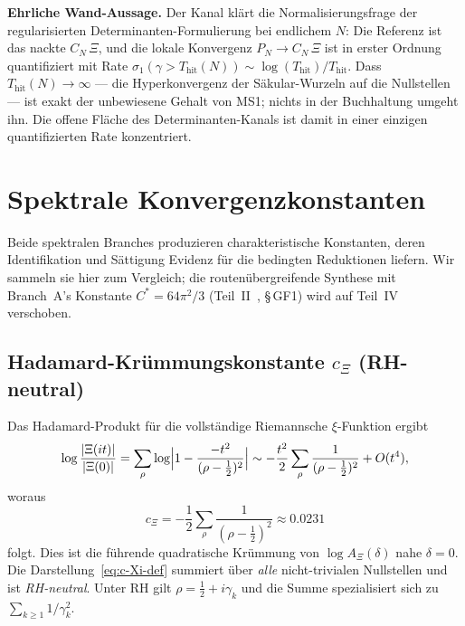 \documentclass[12pt,a4paper]{article}
\theoremstyle{definition}
\theoremstyle{remark}
\begin{document}
\noindent\textbf{Ehrliche Wand-Aussage.} Der Kanal klärt die
Normalisierungsfrage der regularisierten Determinanten-Formulierung bei
endlichem $N$: Die Referenz ist das nackte $C_N\,\Xi$, und die lokale
Konvergenz $P_N \to C_N\,\Xi$ ist in erster Ordnung quantifiziert mit
Rate $\sigma_1(\gamma > T_{\mathrm{hit}}(N)) \sim
\log(T_{\mathrm{hit}})/T_{\mathrm{hit}}$. Dass
$T_{\mathrm{hit}}(N)\to\infty$ --- die Hyperkonvergenz der
Säkular-Wurzeln auf die Nullstellen --- ist exakt der unbewiesene Gehalt
von MS1; nichts in der Buchhaltung umgeht ihn. Die offene Fläche des
Determinanten-Kanals ist damit in einer einzigen quantifizierten Rate
konzentriert.


\section{Spektrale Konvergenzkonstanten}
\label{sec:spectral-constants}

Beide spektralen Branches produzieren charakteristische Konstanten,
deren Identifikation und Sättigung Evidenz für die bedingten Reduktionen
liefern. Wir sammeln sie hier zum Vergleich; die routenübergreifende
Synthese mit Branch~A's Konstante $C^* = 64\pi^2/3$
(Teil~II~\cite{Geiger2026partII}, \S\,GF1) wird auf
Teil~IV~\cite{Geiger2026partIV} verschoben.

\subsection{\texorpdfstring{Hadamard-Krümmungskonstante $c_\Xi$ (RH-neutral)}{Hadamard-Kruemmungskonstante cXi (RH-neutral)}}

Das Hadamard-Produkt für die vollständige Riemannsche
$\xi$-Funktion ergibt
\[
  \log\frac{|\Xi(it)|}{|\Xi(0)|}
  = \sum_\rho \log\Bigl|1 - \frac{-t^2}{(\rho-\tfrac{1}{2})^2}\Bigr|
  \sim -\frac{t^2}{2}\sum_\rho
       \frac{1}{(\rho-\tfrac{1}{2})^2}
  + O(t^4),
\]
woraus
\begin{equation}\label{eq:c-Xi-def}
  c_\Xi = -\frac{1}{2}\sum_\rho
          \frac{1}{(\rho-\tfrac{1}{2})^2}
        \approx 0.0231
\end{equation}
folgt. Dies ist die führende quadratische Krümmung von
$\log A_\Xi(\delta)$ nahe $\delta = 0$. Die
Darstellung~\eqref{eq:c-Xi-def} summiert über \emph{alle}
nicht-trivialen Nullstellen und ist \emph{RH-neutral}. Unter RH gilt
$\rho = \tfrac{1}{2}+i\gamma_k$ und die Summe spezialisiert sich zu
$\sum_{k\geq 1} 1/\gamma_k^2$.
\end{document}
